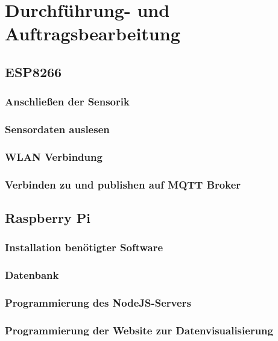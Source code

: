 \chapter{Durchführung- und Auftragsbearbeitung}
\label{cha:Durchfuehrung_und_Auftragsbearbeitung}

\section{ESP8266}
	\subsection{Anschließen der Sensorik}
	
	\subsection{Sensordaten auslesen}
	
	\subsection{WLAN Verbindung}
	
	\subsection{Verbinden zu und publishen auf MQTT Broker}
	
	
\section{Raspberry Pi}
	\subsection{Installation benötigter Software}
	
	\subsection{Datenbank}
	
	\subsection{Programmierung des NodeJS-Servers}
	
	\subsection{Programmierung der Website zur Datenvisualisierung}
	
	
